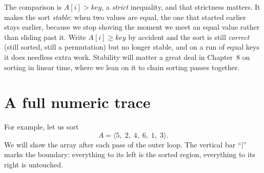 \begin{trapbox}
The comparison is $A[i] > \mathit{key}$, a \emph{strict} inequality, and that strictness
matters. It makes the sort \emph{stable}: when two values are equal, the
one that started earlier stays earlier, because we stop shoving the moment we meet an
equal value rather than sliding past it. Write $A[i] \ge \mathit{key}$ by accident and
the sort is still \emph{correct} (still sorted, still a
permutation) but no longer stable, and on a run of equal keys it does needless
extra work. Stability will matter a great deal in Chapter~8 on sorting in
linear time, where we lean on it to chain sorting passes together.
\end{trapbox}

\section{A full numeric trace}

For example, let us sort
\[
A = \langle 5,\; 2,\; 4,\; 6,\; 1,\; 3 \rangle .
\]
We will show the array after each pass of the outer loop. The vertical bar
``$\mid$'' marks the boundary: everything to its left is the sorted region, everything
to its right is untouched.

